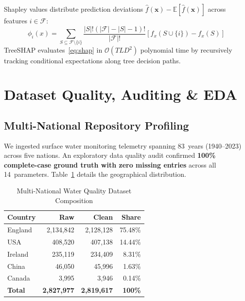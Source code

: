 \documentclass[conference]{IEEEtran}
\begin{document}
Shapley values distribute prediction deviations
$\hat{f}(\mathbf{x}) - \mathbb{E}[\hat{f}(\mathbf{x})]$ across
features $i\in\mathcal{F}$:
\begin{equation}
  \phi_i(x) =
    \sum_{S\subseteq\mathcal{F}\setminus\{i\}}
    \frac{|S|!(|\mathcal{F}|-|S|-1)!}{|\mathcal{F}|!}
    \left[f_x(S\cup\{i\}) - f_x(S)\right]
  \label{eq:shap}
\end{equation}
TreeSHAP evaluates~\eqref{eq:shap} in $\mathcal{O}(TLD^2)$ polynomial time by
recursively tracking conditional expectations along tree decision
paths.

\section{Dataset Quality, Auditing \& EDA}
\label{sec:data}

\subsection{Multi-National Repository Profiling}

We ingested surface water monitoring telemetry spanning 83~years
(1940--2023) across five nations. An exploratory data quality audit
confirmed \textbf{100\% complete-case ground truth with zero missing
entries} across all 14~parameters. Table~\ref{tab:dataset_profile}
details the geographical distribution.

\begin{table}[!t]
  \caption{Multi-National Water Quality Dataset Composition}
  \label{tab:dataset_profile}
  \centering
  \setlength{\tabcolsep}{4pt}
  \begin{tabular}{lrrr}
    \toprule
    \textbf{Country}
      & \textbf{Raw}
      & \textbf{Clean}
      & \textbf{Share} \\
    \midrule
    England  & 2,134,842 & 2,128,128 & 75.48\% \\
    USA      &   408,520 &   407,138 & 14.44\% \\
    Ireland  &   235,119 &   234,409 &  8.31\% \\
    China    &    46,050 &    45,996 &  1.63\% \\
    Canada   &     3,995 &     3,946 &  0.14\% \\
    \midrule
    \textbf{Total}
      & \textbf{2,827,977}
      & \textbf{2,819,617}
      & \textbf{100\%} \\
    \bottomrule
  \end{tabular}
\end{table}
\end{document}
